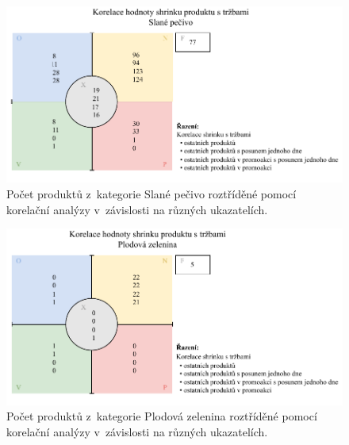 \begin{figure}[h!]
    \centering
    \captionsetup{justification=centering}
    \includegraphics[width=\textwidth]{obrazky/kor_pec.pdf}
    \caption{Počet produktů z~kategorie Slané pečivo roztříděné pomocí korelační analýzy v~závislosti na různých ukazatelích.}
    \label{obr:kategCorrPorovnaniPec}
\end{figure}

\begin{figure}[h!]
    \centering
    \captionsetup{justification=centering}
    \includegraphics[width=\textwidth]{obrazky/kor_zel.pdf}
    \caption{Počet produktů z~kategorie Plodová zelenina roztříděné pomocí korelační analýzy v~závislosti na různých ukazatelích.}
    \label{obr:kategCorrPorovnaniZel}
\end{figure}

